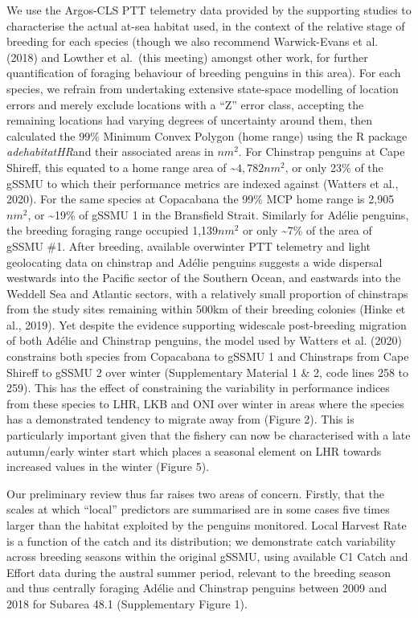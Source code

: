 \documentclass[]{elsarticle} %
\begin{document}
We use the Argos-CLS PTT telemetry data provided by the supporting
studies to characterise the actual at-sea habitat used, in the context
of the relative stage of breeding for each species (though we also
recommend Warwick-Evans et al. (2018) and Lowther et al.~(this meeting)
amongst other work, for further quantification of foraging behaviour of
breeding penguins in this area). For each species, we refrain from
undertaking extensive state-space modelling of location errors and
merely exclude locations with a ``Z'' error class, accepting the
remaining locations had varying degrees of uncertainty around them, then
calculated the 99\% Minimum Convex Polygon (home range) using the R
package \emph{adehabitatHR}and their associated areas in \(nm^2\). For
Chinstrap penguins at Cape Shireff, this equated to a home range area of
\textasciitilde{}\(4,782nm^2\), or only 23\% of the gSSMU to which their
performance metrics are indexed against (Watters et al., 2020). For the
same species at Copacabana the 99\% MCP home range is 2,905\(nm^2\), or
\textasciitilde19\% of gSSMU 1 in the Bransfield Strait. Similarly for
Adélie penguins, the breeding foraging range occupied 1,139\(nm^2\) or
only \textasciitilde7\% of the area of gSSMU \#1. After breeding,
available overwinter PTT telemetry and light geolocating data on
chinstrap and Adélie penguins suggests a wide dispersal westwards into
the Pacific sector of the Southern Ocean, and eastwards into the Weddell
Sea and Atlantic sectors, with a relatively small proportion of
chinstraps from the study sites remaining within 500km of their breeding
colonies (Hinke et al., 2019). Yet despite the evidence supporting
widescale post-breeding migration of both Adélie and Chinstrap penguins,
the model used by Watters et al. (2020) constrains both species from
Copacabana to gSSMU 1 and Chinstraps from Cape Shireff to gSSMU 2 over
winter (Supplementary Material 1 \& 2, code lines 258 to 259). This has
the effect of constraining the variability in performance indices from
these species to LHR, LKB and ONI over winter in areas where the species
has a demonstrated tendency to migrate away from (Figure 2). This is
particularly important given that the fishery can now be characterised
with a late autumn/early winter start which places a seasonal element on
LHR towards increased values in the winter (Figure 5).

Our preliminary review thus far raises two areas of concern. Firstly,
that the scales at which ``local'' predictors are summarised are in some
cases five times larger than the habitat exploited by the penguins
monitored. Local Harvest Rate is a function of the catch and its
distribution; we demonstrate catch variability across breeding seasons
within the original gSSMU, using available C1 Catch and Effort data
during the austral summer period, relevant to the breeding season and
thus centrally foraging Adélie and Chinstrap penguins between 2009 and
2018 for Subarea 48.1 (Supplementary Figure 1).
\end{document}
